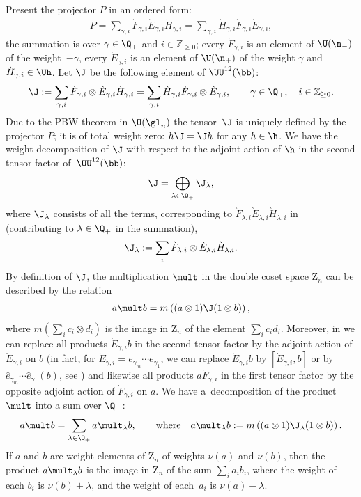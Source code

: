 \documentclass[pdftex]{sigma}
\def\UUb{\UU^{12}(\bb)}\def\V{\mathrm {V}}\def\ve{\varepsilon}\def\Z{\mathrm{Z}}\def\SZ{\mathrm{SZ}}
\numberwithin{equation}{section}
\begin{document}
Present the projector $P$ in an ordered form:
\begin{gather} \label{proof1}
P=
\sum_{\gamma,i}\grave{F}_{\gamma,i}\grave{E}_{\gamma,i}\grave{H}_{\gamma,i}=
\sum_{\gamma,i}\grave{H}_{\gamma,i}\grave{F}_{\gamma,i}\grave{E}_{\gamma,i}  ,
\end{gather}
the summation is over $\gamma\in\Q_+$ and $i\in {\mathbb{Z}}_{\geq 0}$;
every $\grave{F}_{\gamma,i}$ is an element of $\U(\n_-)$ of the weight~$-\gamma$, every
$\grave{E}_{\gamma,i}$ is an element of $\U(\n_+)$ of the weight $\gamma$ and
$\grave{H}_{\gamma,i}\in\Uh$. Let $\J$ be the following element of $\UUb$:
\begin{gather*}
\J :=\sum_{\gamma,i}\grave{F}_{\gamma,i}\otimes\grave{E}_{\gamma,i}\grave{H}_{\gamma,i}=
\sum_{\gamma,i}\grave{H}_{\gamma,i}\grave{F}_{\gamma,i}\otimes\grave{E}_{\gamma,i}  ,\qquad \gamma\in\Q_+  ,\quad i\in {\mathbb{Z}}_{\geq 0}  .
\end{gather*}
Due to the PBW theorem in $\U(\gl_n)$ the tensor~$\J$ is uniquely def\/ined by the projector $P$; it is
of total weight zero: $h\J=\J h$ for any $h\in\h$. We have the weight decomposition of $\J$ with
respect to the adjoint action of $\h$ in the second tensor factor of~$\UUb$:
\begin{gather*}
\J= \bigoplus_{\lambda\in\Q_+}\J_\lambda  ,
\end{gather*}
where $\J_\lambda$ consists of all the terms, corresponding to $\grave{F}_{\lambda,i}\grave{E}_{\lambda,i}
\grave{H}_{\lambda,i}$ in~
(contributing to $\lambda\in\Q_+$ in the summation),
\begin{gather*}
\J_\lambda :=\sum_i\grave{F}_{\lambda,i}\otimes\grave{E}_{\lambda,i}\grave{H}_{\lambda,i}  .
\end{gather*}
By def\/inition of $\J$, the multiplication $\mult$ in the double coset space $\Z_n$ can be described by the relation
\begin{gather}\label{proof4}
a\mult b= m\left( (a\otimes 1)\J (1\otimes b )\right),
\end{gather}
where $m(\sum_ic_i\otimes d_i)$ is the image in $\Z_n$ of the element $\sum_ic_id_i$.
Moreover, in  we can replace all products $\grave{E}_{\gamma,i}b$ in the second tensor
factor by the adjoint action of $\grave{E}_{\gamma,i}$ on $b$ (in fact, for $\grave{E}_{\gamma,i}=e_{\gamma_m}\cdots e_{\gamma_1}$,
we can replace $\grave{E}_{\gamma,i}b$ by $[\grave{E}_{\gamma,i},b]$ or by $\hat{e}_{\gamma_m}\cdots \hat{e}_{\gamma_1}(b)$,
see ) and likewise all products $a\grave{F}_{\gamma,i}$
in the f\/irst tensor factor by the opposite adjoint action of $\grave{F}_{\gamma,i}$ on $a$.
We have a~decomposition of the product $\mult$ into a sum over $\Q_+$:
\begin{gather}\label{proof5}
a\mult b=\sum_{\lambda\in\Q_+}a\mult_\lambda b  ,\qquad\text{where}\quad
a\mult_\lambda b:=m\left( (a\otimes 1)  \J_\lambda (1\otimes b )\right)  .
\end{gather}
If $a$ and $b$ are weight elements of $\Z_n$ of weights $\nu(a)$ and $\nu(b)$, then the product
$a\mult_\lambda b$ is the image in $\Z_n$ of the sum $\sum_i a_ib_i$, where the weight of each
$b_i$ is $\nu(b)+\lambda$, and the weight of each~$a_i$ is $\nu(a)-\lambda$.
\end{document}
